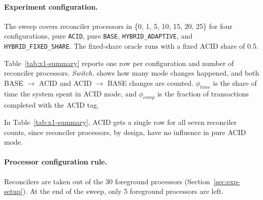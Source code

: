 \paragraph{Experiment configuration.} The sweep covers reconciler processors in
\{0, 1, 5, 10, 15, 20, 25\} for four configurations, pure \texttt{ACID}, pure
\texttt{BASE}, \texttt{HYBRID\_ADAPTIVE}, and \texttt{HYBRID\_FIXED\_SHARE}. The
fixed-share oracle runs with a fixed ACID share of 0.5.

Table~\ref{tab:x1-summary} reports one row per configuration and number of
reconciler processors. \emph{Switch.} shows how many mode changes happened, and
both BASE $\to$ ACID and ACID $\to$ BASE changes are counted. $\phi_{time}$ is
the share of time the system spent in ACID mode, and $\phi_{comp}$ is the
fraction of transactions completed with the ACID tag.

In Table~\ref{tab:x1-summary}, ACID gets a single row for all seven reconciler
counts, since reconciler processors, by design, have no influence in pure ACID
mode.

\paragraph{Processor configuration rule.} Reconcilers are taken out of the 30
foreground processors (Section~\ref{sec:exp-setup}). At the end of the sweep,
only 5 foreground processors are left.

